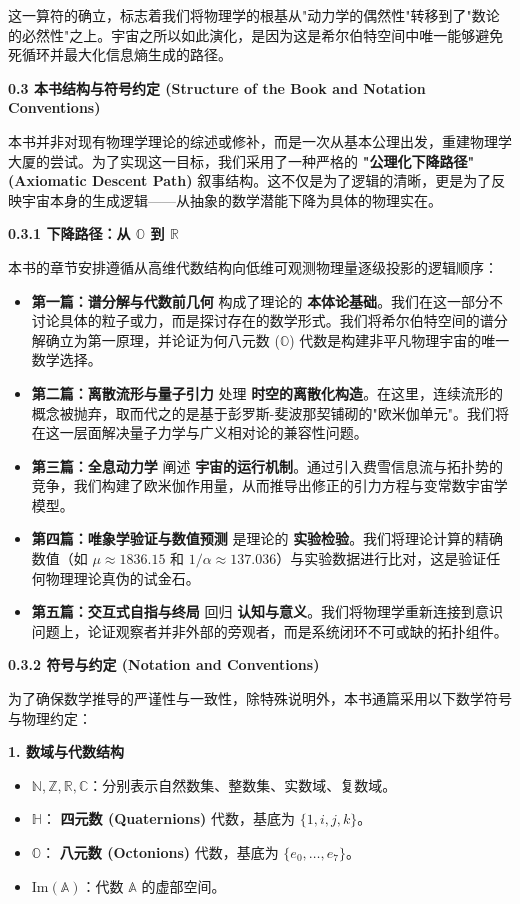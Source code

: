 这一算符的确立，标志着我们将物理学的根基从"动力学的偶然性"转移到了"数论的必然性"之上。宇宙之所以如此演化，是因为这是希尔伯特空间中唯一能够避免死循环并最大化信息熵生成的路径。

\textbf{0.3 本书结构与符号约定 (Structure of the Book and Notation Conventions)}

本书并非对现有物理学理论的综述或修补，而是一次从基本公理出发，重建物理学大厦的尝试。为了实现这一目标，我们采用了一种严格的 \textbf{"公理化下降路径" (Axiomatic Descent Path)} 叙事结构。这不仅是为了逻辑的清晰，更是为了反映宇宙本身的生成逻辑——从抽象的数学潜能下降为具体的物理实在。

\textbf{0.3.1 下降路径：从 $\mathbb{O}$ 到 $\mathbb{R}$}

本书的章节安排遵循从高维代数结构向低维可观测物理量逐级投影的逻辑顺序：

\begin{itemize}
\item \textbf{第一篇：谱分解与代数前几何} 构成了理论的 \textbf{本体论基础}。我们在这一部分不讨论具体的粒子或力，而是探讨存在的数学形式。我们将希尔伯特空间的谱分解确立为第一原理，并论证为何八元数 ($\mathbb{O}$) 代数是构建非平凡物理宇宙的唯一数学选择。
\item \textbf{第二篇：离散流形与量子引力} 处理 \textbf{时空的离散化构造}。在这里，连续流形的概念被抛弃，取而代之的是基于彭罗斯-斐波那契铺砌的"欧米伽单元"。我们将在这一层面解决量子力学与广义相对论的兼容性问题。
\item \textbf{第三篇：全息动力学} 阐述 \textbf{宇宙的运行机制}。通过引入费雪信息流与拓扑势的竞争，我们构建了欧米伽作用量，从而推导出修正的引力方程与变常数宇宙学模型。
\item \textbf{第四篇：唯象学验证与数值预测} 是理论的 \textbf{实验检验}。我们将理论计算的精确数值（如 $\mu \approx 1836.15$ 和 $1/\alpha \approx 137.036$）与实验数据进行比对，这是验证任何物理理论真伪的试金石。
\item \textbf{第五篇：交互式自指与终局} 回归 \textbf{认知与意义}。我们将物理学重新连接到意识问题上，论证观察者并非外部的旁观者，而是系统闭环不可或缺的拓扑组件。
\end{itemize}

\textbf{0.3.2 符号与约定 (Notation and Conventions)}

为了确保数学推导的严谨性与一致性，除特殊说明外，本书通篇采用以下数学符号与物理约定：

\textbf{1. 数域与代数结构}
\begin{itemize}
\item $\mathbb{N}, \mathbb{Z}, \mathbb{R}, \mathbb{C}$：分别表示自然数集、整数集、实数域、复数域。
\item $\mathbb{H}$： \textbf{四元数 (Quaternions)} 代数，基底为 $\{1, i, j, k\}$。
\item $\mathbb{O}$： \textbf{八元数 (Octonions)} 代数，基底为 $\{e_0, \dots, e_7\}$。
\item $\text{Im}(\mathbb{A})$：代数 $\mathbb{A}$ 的虚部空间。
\end{itemize}

